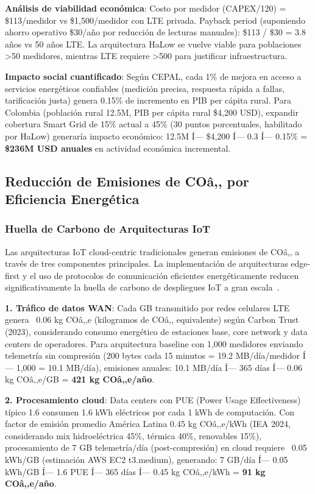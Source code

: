 \textbf{Análisis de viabilidad económica}: Costo por medidor (CAPEX/120) = \$113/medidor vs \$1,500/medidor con LTE privada. Payback period (suponiendo ahorro operativo \$30/año por reducción de lecturas manuales): \$113 / \$30 = 3.8 años vs 50 años LTE. La arquitectura HaLow se vuelve viable para poblaciones >50 medidores, mientras LTE requiere >500 para justificar infraestructura.

\textbf{Impacto social cuantificado}: Según CEPAL, cada 1\% de mejora en acceso a servicios energéticos confiables (medición precisa, respuesta rápida a fallas, tarificación justa) genera 0.15\% de incremento en PIB per cápita rural. Para Colombia (población rural 12.5M, PIB per cápita rural \$4,200 USD), expandir cobertura Smart Grid de 15\% actual a 45\% (30 puntos porcentuales, habilitado por HaLow) generaría impacto económico: 12.5M Í— \$4,200 Í— 0.3 Í— 0.15\% = \textbf{\$236M USD anuales} en actividad económica incremental.

\subsection{Reducción de Emisiones de COâ‚‚ por Eficiencia Energética}

\subsubsection{Huella de Carbono de Arquitecturas IoT}

Las arquitecturas IoT cloud-centric tradicionales generan emisiones de COâ‚‚ a través de tres componentes principales. La implementación de arquitecturas edge-first y el uso de protocolos de comunicación eficientes energéticamente reducen significativamente la huella de carbono de despliegues IoT a gran escala~\cite{sharmaEnergyEfficientIoTRFDriven2025}.

\textbf{1. Tráfico de datos WAN}: Cada GB transmitido por redes celulares LTE genera ~0.06 kg COâ‚‚e (kilogramos de COâ‚‚ equivalente) según Carbon Trust (2023), considerando consumo energético de estaciones base, core network y data centers de operadores. Para arquitectura baseline con 1,000 medidores enviando telemetría sin compresión (200 bytes cada 15 minutos = 19.2 MB/día/medidor Í— 1,000 = 10.1 MB/día), emisiones anuales: 10.1 MB/día Í— 365 días Í— 0.06 kg COâ‚‚e/GB = \textbf{421 kg COâ‚‚e/año}.

\textbf{2. Procesamiento cloud}: Data centers con PUE (Power Usage Effectiveness) típico 1.6 consumen 1.6 kWh eléctricos por cada 1 kWh de computación. Con factor de emisión promedio América Latina 0.45 kg COâ‚‚e/kWh (IEA 2024, considerando mix hidroeléctrica 45\%, térmica 40\%, renovables 15\%), procesamiento de 7 GB telemetría/día (post-compresión) en cloud requiere ~0.05 kWh/GB (estimación AWS EC2 t3.medium), generando: 7 GB/día Í— 0.05 kWh/GB Í— 1.6 PUE Í— 365 días Í— 0.45 kg COâ‚‚e/kWh = \textbf{91 kg COâ‚‚e/año}.


